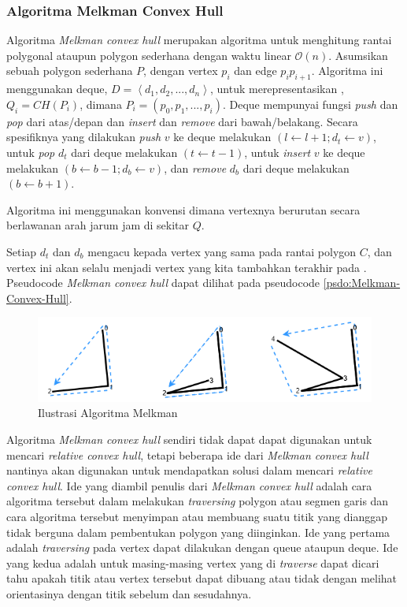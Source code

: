 \subsubsection{Algoritma Melkman Convex Hull}
\label{sec:algoritma-melkman-convex-hull}
Algoritma \textit{Melkman convex hull} merupakan algoritma untuk menghitung rantai polygonal ataupun polygon sederhana dengan waktu linear $\mathcal{O}(n)$\cite{melkman_algorithm}. Asumsikan sebuah polygon sederhana $P$, dengan vertex $p_i$ dan edge $p_i p_{i+1}$. Algoritma ini menggunakan deque, $D = \left \langle d_1, d_2, ..., d_n \right \rangle$, untuk merepresentasikan \CH, $Q_i = CH(P_i)$, dimana $P_i = (p_0, p_1, ..., p_i)$. Deque mempunyai fungsi \textit{push} dan \textit{pop} dari atas/depan dan \textit{insert} dan \textit{remove} dari bawah/belakang. Secara spesifiknya yang dilakukan \textit{push} $v$ ke deque melakukan $(l \leftarrow l+1; d_t \leftarrow v)$, untuk \textit{pop} $d_t$ dari deque melakukan $(t \leftarrow t-1)$, untuk \textit{insert} $v$ ke deque melakukan $(b \leftarrow b-1; d_b \leftarrow v)$, dan \textit{remove} $d_b$ dari deque melakukan $(b \leftarrow b+1)$.
\par Algoritma ini menggunakan konvensi dimana vertexnya berurutan secara berlawanan arah jarum jam di sekitar \CH $Q$.
\par Setiap $d_t$ dan $d_b$ mengacu kepada vertex yang sama pada rantai polygon $C$, dan vertex ini akan selalu menjadi vertex yang kita tambahkan terakhir pada \CH. Pseudocode \textit{Melkman convex hull} dapat dilihat pada pseudocode \ref{psdo:Melkman-Convex-Hull}.
\begin{figure}[!h]
	\Centering
	\includegraphics [width=\columnwidth]{bab2/img/ilustrasi-algoritma-melkman}
	\caption {Ilustrasi Algoritma Melkman}
	\label {fig:ilustrasi-algoritma-melkman}
\end{figure}
\par Algoritma \textit{Melkman convex hull} sendiri tidak dapat dapat digunakan untuk mencari \textit{relative convex hull}, tetapi beberapa ide dari \textit{Melkman convex hull} nantinya akan digunakan untuk mendapatkan solusi dalam mencari \textit{relative convex hull}. Ide yang diambil penulis dari \textit{Melkman convex hull} adalah cara algoritma tersebut dalam melakukan \textit{traversing} polygon atau segmen garis dan cara algoritma tersebut menyimpan atau membuang suatu titik yang dianggap tidak berguna dalam pembentukan polygon yang diinginkan. Ide yang pertama adalah \textit{traversing} pada vertex dapat dilakukan dengan queue ataupun deque. Ide yang kedua adalah untuk masing-masing vertex yang di \textit{traverse} dapat dicari tahu apakah titik atau vertex tersebut dapat dibuang atau tidak dengan melihat orientasinya dengan titik sebelum dan sesudahnya.
